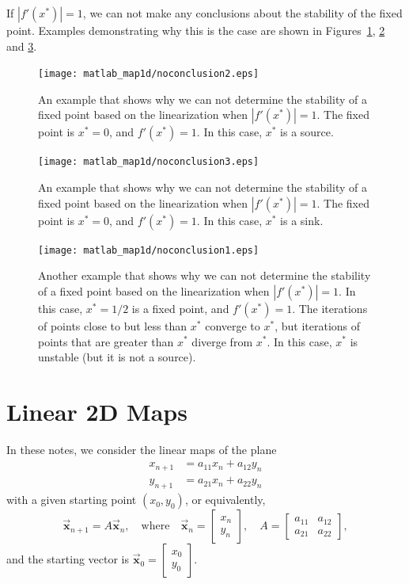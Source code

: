 \documentclass[reqno]{immbook}
\newcommand{\BX}{\vec{\textbf{x}}}
\newcommand{\ds}{\displaystyle}
\begin{document}
\bigskip
If $|f'(x^*)|=1$, we can not make any conclusions about the
stability of the fixed point.  Examples demonstrating why this
is the case are shown in Figures~\ref{fig:noconclusion2},
\ref{fig:noconclusion3}
and \ref{fig:noconclusion1}.
%
\begin{figure}
\centerline{%
\texttt{[image: matlab\_map1d/noconclusion2.eps]}%
}
\caption{An example that shows why we can not determine
the stability of a fixed point based on the linearization
when
$|f'(x^*)|=1$.  The fixed point is $x^*=0$, and $f'(x^*)=1$.
In this case, $x^*$ is a source.}
\label{fig:noconclusion2}
\end{figure}
%
\begin{figure}
\centerline{%
\texttt{[image: matlab\_map1d/noconclusion3.eps]}%
}
\caption{An example that shows why we can not determine
the stability of a fixed point based on the linearization
when
$|f'(x^*)|=1$.  The fixed point is $x^*=0$, and $f'(x^*)=1$.
In this case, $x^*$ is a sink.}
\label{fig:noconclusion3}
\end{figure}
%
\begin{figure}
\centerline{%
\texttt{[image: matlab\_map1d/noconclusion1.eps]}%
}
\caption{Another example that shows why we can not determine
the stability of a fixed point based on the linearization
when
$|f'(x^*)|=1$.  In this case, $x^*=1/2$ is a fixed point,
and $f'(x^*)=1$.
The iterations of points close to but less than $x^*$
converge to $x^*$, but iterations of points that are
greater than $x^*$ diverge from $x^*$.
In this case, $x^*$ is unstable (but it is not a source).
}
\label{fig:noconclusion1}
\end{figure}

%
%
\section{Linear 2D Maps}

In these notes, we consider the linear maps of the plane
\begin{equation}
\begin{split}
  x_{n+1} & = a_{11}x_n + a_{12}y_n \\
  y_{n+1} & = a_{21}x_n + a_{22}y_n
\end{split}
\end{equation}
with a given starting point $(x_0,y_0)$,
or equivalently,
\begin{equation}
  \BX_{n+1} = A\BX_n, \quad \textrm{where} \quad
     \BX_n = \begin{bmatrix} x_n \\ y_n \end{bmatrix},
     \quad
     A = \begin{bmatrix} a_{11} & a_{12} \\ a_{21} & a_{22} \end{bmatrix},
\label{eqn:linearmap}
\end{equation}
and the starting vector is
$\ds \BX_0 = \begin{bmatrix} x_0 \\ y_0 \end{bmatrix}$.
%
%
\end{document}
